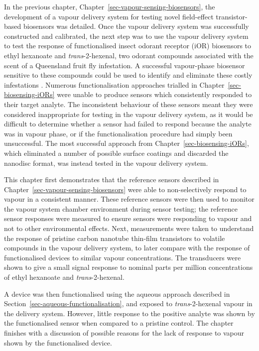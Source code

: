 \documentclass[
  a4paper,
]{scrbook}
\begin{document}
In the previous chapter, Chapter~\ref{sec-vapour-sensing-biosensors},
the development of a vapour delivery system for testing novel
field-effect transistor-based biosensors was detailed. Once the vapour
delivery system was successfully constructed and calibrated, the next
step was to use the vapour delivery system to test the response of
functionalised insect odorant receptor (iOR) biosensors to ethyl
hexanoate and \emph{trans}-2-hexenal, two odorant compounds associated
with the scent of a Queensland fruit fly infestation. A successful
vapour-phase biosensor sensitive to these compounds could be used to
identify and eliminate these costly infestations
\autocite{Queensland1,Queensland2}. Numerous functionalisation
approaches trialled in Chapter~\ref{sec-biosensing-iORs} were unable to
produce sensors which consistently responded to their target analyte.
The inconsistent behaviour of these sensors meant they were considered
inappropriate for testing in the vapour delivery system, as it would be
difficult to determine whether a sensor had failed to respond because
the analyte was in vapour phase, or if the functionalisation procedure
had simply been unsuccessful. The most successful approach from
Chapter~\ref{sec-biosensing-iORs}, which eliminated a number of possible
surface coatings and discarded the nanodisc format, was instead tested
in the vapour delivery system.

This chapter first demonstrates that the reference sensors described in
Chapter~\ref{sec-vapour-sensing-biosensors} were able to non-selectively
respond to vapour in a consistent manner. These reference sensors were
then used to monitor the vapour system chamber environment during sensor
testing; the reference sensor responses were measured to ensure sensors
were responding to vapour and not to other environmental effects. Next,
measurements were taken to understand the response of pristine carbon
nanotube thin-film transistors to volatile compounds in the vapour
delivery system, to later compare with the response of functionalised
devices to similar vapour concentrations. The transducers were shown to
give a small signal response to nominal parts per million concentrations
of ethyl hexanoate and \emph{trans}-2-hexenal.

A device was then functionalised using the aqueous approach described in
Section~\ref{sec-aqueous-functionalisation}, and exposed to
\emph{trans}-2-hexenal vapour in the delivery system. However, little
response to the positive analyte was shown by the functionalised sensor
when compared to a pristine control. The chapter finishes with a
discussion of possible reasons for the lack of response to vapour shown
by the functionalised device.
\end{document}
